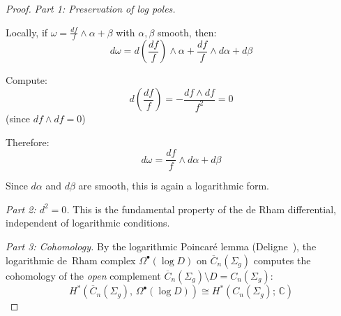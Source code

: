 \begin{proof}
\emph{Part 1: Preservation of log poles.}

Locally, if $\omega = \frac{df}{f} \wedge \alpha + \beta$ with $\alpha, \beta$ smooth, then:
\[d\omega = d\left(\frac{df}{f}\right) \wedge \alpha + \frac{df}{f} \wedge d\alpha + d\beta\]

Compute:
\[d\left(\frac{df}{f}\right) = -\frac{df \wedge df}{f^2} = 0\]
(since $df \wedge df = 0$)

Therefore:
\[d\omega = \frac{df}{f} \wedge d\alpha + d\beta\]

Since $d\alpha$ and $d\beta$ are smooth, this is again a logarithmic form.

\emph{Part 2: $d^2 = 0$.}
This is the fundamental property of the de Rham differential, independent of logarithmic conditions.

\emph{Part 3: Cohomology.}
By the logarithmic Poincar\'{e} lemma (Deligne~\cite{Deligne71}), the logarithmic de~Rham complex $\Omega^\bullet(\log D)$ on $\overline{C}_n(\Sigma_g)$ computes the cohomology of the \emph{open} complement $\overline{C}_n(\Sigma_g) \setminus D = C_n(\Sigma_g)$:
\[H^*(\overline{C}_n(\Sigma_g),\, \Omega^\bullet(\log D)) \cong H^*(C_n(\Sigma_g);\, \mathbb{C})\]
\end{proof}

